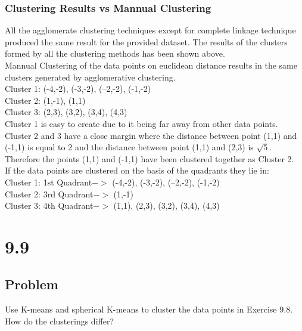 \documentclass[12pt]{report}
\begin{document}
\subsection{Clustering Results vs Mannual Clustering }
All the agglomerate clustering techniques except for complete linkage technique produced the same result for the provided dataset. The results of the clusters formed by all the clustering methods has been shown above.\\
Mannual Clustering of the data points on euclidean distance results in the same clusters generated by agglomerative clustering.\\
Cluster 1: (-4,-2), (-3,-2), (--2,-2), (-1,-2)\\
Cluster 2: (1,-1), (1,1)\\
Cluster 3: (2,3), (3,2), (3,4), (4,3)\\
Cluster 1 is easy to create due to it being far away from other data points. Cluster 2 and 3 have a close margin where the distance between point (1,1) and (-1,1) is equal to 2 and the distance between point (1,1) and (2,3) is $\sqrt{5}$. Therefore the points (1,1) and (-1,1) have been clustered together as Cluster 2.\\
If the data points are clustered on the basis of the quadrants they lie in:\\
Cluster 1: 1st Quadrant$ ->$ (-4,-2), (-3,-2), (--2,-2), (-1,-2)\\
Cluster 2: 3rd Quadrant$ ->$ (1,-1)\\
Cluster 3:  4th Quadrant$ ->$ (1,1), (2,3), (3,2), (3,4), (4,3)\\
\chapter{9.9}
\section{Problem}
Use K-means and spherical K-means to cluster the data points in Exercise 9.8. How do the clusterings differ?
\end{document}
